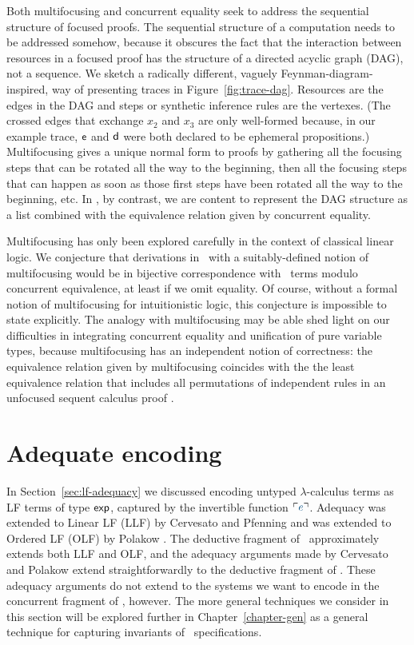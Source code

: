 Both multifocusing and concurrent equality seek to address the
sequential structure of focused proofs. The sequential structure of a
computation needs to be addressed somehow, because it obscures the
fact that the interaction between resources in a focused proof has the
structure of a directed acyclic graph (DAG), not a sequence. We sketch
a radically different, vaguely 
Feynman-diagram-inspired, way of presenting traces in
Figure~\ref{fig:trace-dag}. Resources are the edges in the DAG
and steps or synthetic inference rules are the vertexes. (The crossed
edges that exchange $x_2$ and $x_3$ are only well-formed because, in
our example trace, ${\sf e}$ and ${\sf d}$ were both declared to be
ephemeral propositions.) Multifocusing gives a unique normal form to
proofs by gathering all the focusing steps that can be rotated all the
way to the beginning, then all the focusing steps that can happen as
soon as those first steps have been rotated all the way to the
beginning, etc. In \sls, by contrast, we are content to represent the
DAG structure as a list combined with the equivalence relation given
by concurrent equality.

Multifocusing has only been explored carefully in the context of
classical linear logic. We conjecture that derivations in \ollll~with a
suitably-defined notion
of multifocusing would be in bijective correspondence with
\sls~terms modulo concurrent equivalence, at least if we omit
equality. Of course, without a formal notion of multifocusing for
intuitionistic logic, this conjecture is impossible to state
explicitly. The analogy with multifocusing may be able shed light on
our difficulties in integrating concurrent equality and unification
of pure variable types, because multifocusing has an independent
notion of correctness: the equivalence relation given by multifocusing
coincides with the the least equivalence relation that includes all
permutations of independent rules in an unfocused sequent calculus
proof \cite{chaudhuri08canonical}.

\section{Adequate encoding}
\label{sec:sls-adequate}

In Section~\ref{sec:lf-adequacy} we discussed encoding untyped
$\lambda$-calculus terms as LF terms of type ${\sf exp}$, captured by
the invertible function $\interp{e}$. Adequacy was extended to Linear
LF (LLF) by Cervesato and Pfenning \cite{cervesato02linear} and was
extended to Ordered LF (OLF) by Polakow \cite{polakow01ordered}. The
deductive fragment of \sls~approximately extends both LLF and OLF, and
the adequacy arguments made by Cervesato and Polakow extend
straightforwardly to the deductive fragment of \sls. These adequacy
arguments do not extend to the systems we want to encode in the
concurrent fragment of \sls, however. The more general techniques
we consider in this section will be explored further in 
Chapter~\ref{chapter-gen} as a
general technique for capturing invariants of \sls~specifications.

